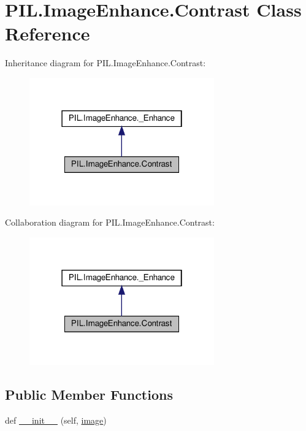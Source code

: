 \hypertarget{classPIL_1_1ImageEnhance_1_1Contrast}{}\section{P\+I\+L.\+Image\+Enhance.\+Contrast Class Reference}
\label{classPIL_1_1ImageEnhance_1_1Contrast}


Inheritance diagram for P\+I\+L.\+Image\+Enhance.\+Contrast\+:
\nopagebreak
\begin{figure}[H]
\begin{center}
\leavevmode
\includegraphics[width=226pt]{classPIL_1_1ImageEnhance_1_1Contrast__inherit__graph}
\end{center}
\end{figure}


Collaboration diagram for P\+I\+L.\+Image\+Enhance.\+Contrast\+:
\nopagebreak
\begin{figure}[H]
\begin{center}
\leavevmode
\includegraphics[width=226pt]{classPIL_1_1ImageEnhance_1_1Contrast__coll__graph}
\end{center}
\end{figure}
\subsection*{Public Member Functions}
\begin{DoxyCompactItemize}
\item 
def \hyperlink{classPIL_1_1ImageEnhance_1_1Contrast_ab9055bde0f26de232981904d4e841a28}{\+\_\+\+\_\+init\+\_\+\+\_\+} (self, \hyperlink{classPIL_1_1ImageEnhance_1_1Contrast_aead873f9ac0d69b50f5abdc78ca3c140}{image})
\end{DoxyCompactItemize}
